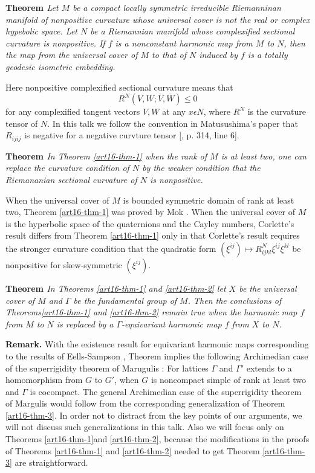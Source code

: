 \medskip
\noindent
{\bfseries Theorem  \label{art16-thm-1}} \textit{Let $M$ be a compact locally symmetric irreducible Riemanninan manifold of nonpositive curvature whose universal cover is not the real or complex hypebolic space. Let $N$ be a Riemannian manifold whose complexified sectional curvature is nonpositive. If $f$ is a nonconstant harmonic map from $M$ to $N$, then the map from the universal cover of $M$ to that of $N$ induced by $f$ is a totally geodesic isometric embedding.}

Here nonpositive complexified sectional curvature means that
$$
R^{N}(V, W; \overline{V}, \overline{W})\leq 0
$$
for any complexified tangent vectors $V, W$ at any $x \epsilon N$, where $R^{N}$ is the curvature tensor of $N$. In this talk we follow the convention in Matusushima's paper \cite{art16-keyMat} that $R_{ijij}$ is negative for a negative curvture tensor [\cite{art16-Mat}, p. 314, line 6].

\medskip
\noindent
{\bfseries Theorem  \label{art16-thm-2}} \textit{In Theorem \ref{art16-thm-1} when the rank of $M$ is at least two, one can replace the curvature condition of $N$ by the weaker condition that the Riemananian sectional curvature of $N$ is nonpositive.}

When the universal cover of $M$ is bounded symmetric domain of rank at least two, Theorem \ref{art16-thm-1} was proved by Mok \cite{art16-Mo}. When the universal cover of $M$ is the hyperbolic space of the quaternions and the Cayley numbers, Corlette's result differs from Theorem \ref{art16-thm-1} only in that Corlette's result requires the stronger curvature condition that the quadratic form $(\xi^{ij}) \mapsto R_{ijkl}^{N}\xi^{ij}\xi^{kl}$ be nonpositive for skew-symmetric $(\xi^{ij})$.

\medskip
\noindent
{\bfseries Theorem  \label{art16-thm-3}} \textit{In Theorems \ref{art16-thm-1} and \ref{art16-thm-2} let $X$ be the universal cover of $M$ and $\Gamma$ be the fundamental group of $M$. Then the conclusions of
Theorems\ref{art16-thm-1} and \ref{art16-thm-2} remain true when the harmonic map $f$ from $M$ to $N$ is replaced by a $\Gamma$-equivariant harmonic map $f$ from $X$ to $N$.}

\medskip
\noindent
{\bfseries Remark.} With the existence result for equivariant harmonic maps corresponding to the results of Eells-Sampson \cite{art16-keyE-S}, Theorem \cite{art16-thm-3} implies the following Archimedian case of the superrigidity theorem of Marugulis \cite{art16-keyMar}: For lattices $\Gamma$ and $\Gamma'$ extends to a homomorphism from $G$ to $G'$, when $G$ is noncompact simple of rank at least two and $\Gamma$ is cocompact. The general Archimedian case of the superrigidity theorem of Margulis would follow from the corresponding generalization of Theorem \ref{art16-thm-3}. In order not to distract from the key points of our arguments, we will not discuss such generalizations in this talk. Also we will focus only on Theorems \ref{art16-thm-1}and \ref{art16-thm-2}, because the modifications in the proofs of Theorems
\ref{art16-thm-1} and \ref{art16-thm-2} needed to get Theorem \ref{art16-thm-3} are straightforward. 

